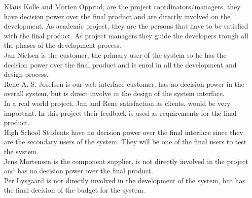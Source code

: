 Klaus Kolle and Morten Opprud, are the project coordinators/managers, they
have decision power over the final product and are directly involved on the development. As academic project, they are the persons that have to be satisfied with the final product. As project managers they guide the developers trough all the phases of the development process.\\

Jan Nielsen is the customer, the primary user of the system so he has the decision power over the final product and is enrol in all the development and design process. \\

Rene A. S. Josefsen is our web-interface customer, has no decision power in the overall system, but is direct involve in the design of the system interface.\\

In a real world project, Jan and Rene satisfaction as clients, would be very important. In this project their feedback is used as requirements for the final product.\\ 

High School Students have no decision power over the final interface since they are the secondary users of the system. They will be one of the final users to test the system.\\

Jens Mortensen is the component supplier, is not directly involved in the project and has no decision power over the final product.\\

Per Lysgaard is not directly involved in the development of the system, but has the final decision of the budget for the system.\\

